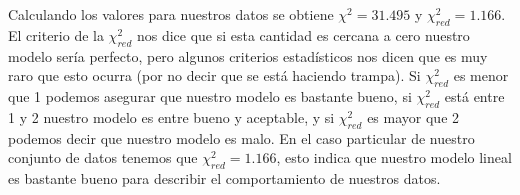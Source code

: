 \documentclass[12pt,letterpaper]{report}
\begin{document}
Calculando los valores para nuestros datos se obtiene  $\chi^{2}= 31.495$ y  $\chi_{red}^{2}= 1.166$. El criterio de la $\chi_{red}^{2}$ nos dice que si esta cantidad es cercana a cero nuestro modelo sería perfecto, pero algunos criterios estadísticos nos dicen que es muy raro que esto ocurra (por no decir que se está haciendo trampa). Si $\chi_{red}^{2}$ es menor que 1 podemos asegurar que nuestro modelo es bastante bueno, si $\chi_{red}^{2}$ está entre 1 y 2 nuestro modelo es entre bueno y aceptable, y si $\chi_{red}^{2}$ es mayor que 2 podemos decir que nuestro modelo es malo. En el caso particular de nuestro conjunto de datos tenemos que $\chi_{red}^{2}= 1.166$, esto indica que nuestro modelo lineal es bastante bueno para describir el comportamiento de nuestros datos.
\end{document}
